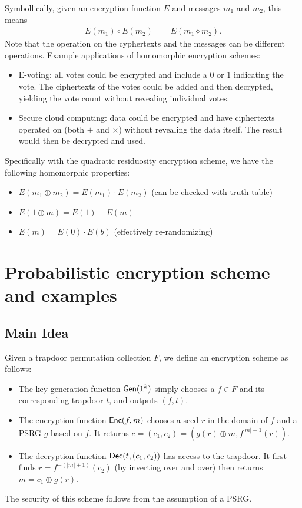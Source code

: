 \documentclass[10pt]{article}
\begin{document}
Symbollically, given an encryption function $E$ and messages $m_1$ and $m_2$, this means
\begin{align*}
E(m_1) \circ E(m_2) &= E(m_1 \diamond m_2).
\end{align*}
Note that the operation on the cyphertexts and the messages can be different operations. Example applications of homomorphic encryption schemes:
\begin{itemize}
	\item E-voting: all votes could be encrypted and include a 0 or 1 indicating the vote. The ciphertexts of the votes could be added and then decrypted, yielding the vote count without revealing individual votes.
	\item Secure cloud computing: data could be encrypted and have ciphertexts operated on (both $+$ and $\times$) without revealing the data itself. The result would then be decrypted and used.
\end{itemize}
Specifically with the quadratic residuosity encryption scheme, we have the following homomorphic properties:
\begin{itemize}
	\item $E(m_1 \oplus m_2) = E(m_1) \cdot E(m_2)$ (can be checked with truth table)
	\item $E(1 \oplus m) = E(1) - E(m)$
	\item $E(m) = E(0) \cdot E(b)$ (effectively re-randomizing)
\end{itemize}





\section{Probabilistic encryption scheme and examples}

\subsection{Main Idea}

Given a trapdoor permutation collection $F$, we define an encryption scheme as follows:
\begin{itemize}
	\item The key generation function $\mathsf{Gen}(1^k)$ simply chooses a $f\in F$ and its corresponding trapdoor $t$, and outputs $(f, t)$.
	\item The encryption function $\mathsf{Enc}(f, m)$ chooses a seed $r$ in the domain of $f$ and a PSRG $g$ based on $f$. It returns $c = (c_1, c_2) = (g(r)\oplus m, f^{|m|+1}(r))$.
	\item The decryption function $\mathsf{Dec}(t, (c_1, c_2))$ has access to the trapdoor. It first finds $r = f^{-(|m|+1)}(c_2)$ (by inverting over and over) then returns $m=c_1 \oplus g(r)$.
\end{itemize}
The security of this scheme follows from the assumption of a PSRG.
\end{document}
